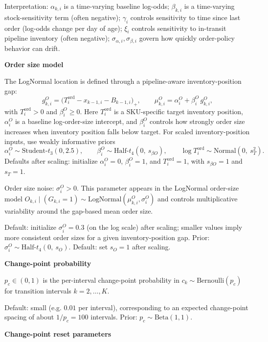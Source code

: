 \documentclass[11pt]{article}
\begin{document}
Interpretation: $\alpha_{k,i}$ is a time-varying baseline log-odds; $\beta_{k,i}$ is a time-varying stock-sensitivity term (often negative); $\gamma_i$ controls sensitivity to time since last order (log-odds change per day of age); $\xi_i$ controls sensitivity to in-transit pipeline inventory (often negative); $\sigma_{\alpha,i},\sigma_{\beta,i}$ govern how quickly order-policy behavior can drift.

\textbf{Order size model}

The LogNormal location is defined through a pipeline-aware inventory-position gap:
\[
  g^{O}_{k,i}=\bigl(T^{\mathrm{ord}}_i-x_{k-1,i}-B_{k-1,i}\bigr)_+,
  \qquad
  \mu^{O}_{k,i}=\alpha^{O}_i+\beta^{O}_i\,g^{O}_{k,i},
\]
with $T^{\mathrm{ord}}_i>0$ and $\beta^{O}_i\ge 0$.
Here $T^{\mathrm{ord}}_i$ is a SKU-specific target inventory position, $\alpha^{O}_i$ is a baseline log-order-size intercept, and $\beta^{O}_i$ controls how strongly order size increases when inventory position falls below target.
For scaled inventory-position inputs, use weakly informative priors
\[
  \alpha^{O}_i \sim \text{Student-}t_3(0,2.5),\qquad
  \beta^{O}_i \sim \text{Half-}t_4(0,\ s_{\beta O}),\qquad
  \log T^{\mathrm{ord}}_i \sim \text{Normal}(0,\ s_T^2).
\]
Defaults after scaling: initialize $\alpha^{O}_i=0$, $\beta^{O}_i=1$, and $T^{\mathrm{ord}}_i=1$, with $s_{\beta O}=1$ and $s_T=1$.

Order size noise: $\sigma^{O}_i > 0$.
This parameter appears in the LogNormal order-size model
$O_{k,i}\mid(G_{k,i}=1)\sim\text{LogNormal}(\mu^{O}_{k,i},\sigma^{O}_i)$ and controls multiplicative variability around the gap-based mean order size.

Default: initialize $\sigma^{O}_i=0.3$ (on the log scale) after scaling; smaller values imply more consistent order sizes for a given inventory-position gap.
Prior: $\sigma^{O}_i \sim \text{Half-}t_{4}(0,\ s_O)$.
Default: set $s_O=1$ after scaling.

\textbf{Change-point probability}

$p_c \in (0,1)$ is the per-interval change-point probability in
$c_k\sim\text{Bernoulli}(p_c)$ for transition intervals $k=2,\dots,K$.

Default: small (e.g. $0.01$ per interval), corresponding to an expected change-point spacing of about $1/p_c=100$ intervals.
Prior: $p_c \sim \text{Beta}(1,1)$.

\textbf{Change-point reset parameters}
\end{document}

